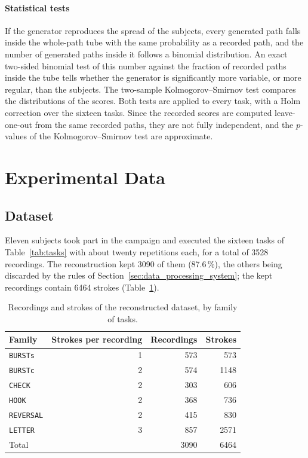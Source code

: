\documentclass[12pt]{report}
\begin{document}
\paragraph{Statistical tests}
If the generator reproduces the spread of the subjects, every generated path falls inside the whole-path tube with the same probability as a recorded path, and the number of generated paths inside it follows a binomial distribution. An exact two-sided binomial test of this number against the fraction of recorded paths inside the tube tells whether the generator is significantly more variable, or more regular, than the subjects. The two-sample Kolmogorov--Smirnov test compares the distributions of the scores. Both tests are applied to every task, with a Holm correction over the sixteen tasks. Since the recorded scores are computed leave-one-out from the same recorded paths, they are not fully independent, and the $p$-values of the Kolmogorov--Smirnov test are approximate.

\section{Experimental Data}
\label{sec:experimental_data}

\subsection{Dataset}
Eleven subjects took part in the campaign and executed the sixteen tasks of Table~\ref{tab:tasks} with about twenty repetitions each, for a total of 3528 recordings. The reconstruction kept 3090 of them (87.6\,\%), the others being discarded by the rules of Section~\ref{sec:data_processing_system}; the kept recordings contain 6464 strokes (Table~\ref{tab:dataset}).

\begin{table}[htbp]
    \centering
    \caption{Recordings and strokes of the reconstructed dataset, by family of tasks.}
    \label{tab:dataset}
    \begin{tabular}{lrrr}
        \toprule
        Family & Strokes per recording & Recordings & Strokes\\
        \midrule
        \texttt{BURSTs}   & 1 & 573  & 573\\
        \texttt{BURSTc}   & 2 & 574  & 1148\\
        \texttt{CHECK}    & 2 & 303  & 606\\
        \texttt{HOOK}     & 2 & 368  & 736\\
        \texttt{REVERSAL} & 2 & 415  & 830\\
        \texttt{LETTER}   & 3 & 857  & 2571\\
        \midrule
        Total             &   & 3090 & 6464\\
        \bottomrule
    \end{tabular}
\end{table}
\end{document}
